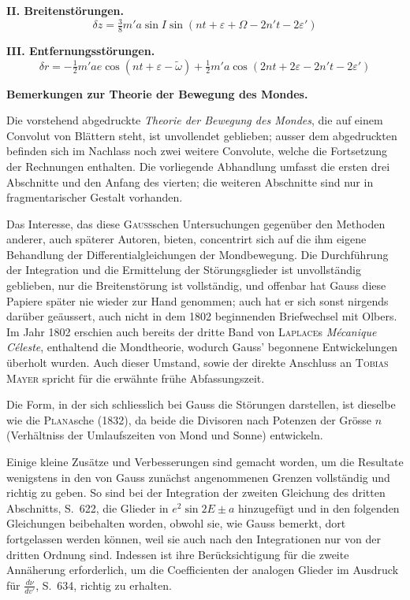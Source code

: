 \documentclass[10pt,a4paper]{article}
\begin{document}
\textbf{II. Breitenst\"orungen.}
\begin{equation*}
\delta z = \tfrac{3}{8}m'a\sin I\sin(nt + \varepsilon + \Omega - 2n't - 2\varepsilon')
\end{equation*}

\textbf{III. Entfernungsst\"orungen.}
\begin{equation*}
\delta r = -\tfrac{1}{2}m'ae\cos(nt + \varepsilon - \tilde{\omega}) + \tfrac{1}{2}m'a\cos(2nt + 2\varepsilon - 2n't - 2\varepsilon')
\end{equation*}

\newpage
\noindent\textbf{Bemerkungen zur Theorie der Bewegung des Mondes.}

\bigskip
\noindent
Die vorstehend abgedruckte \textit{Theorie der Bewegung des Mondes}, die auf einem Convolut von Bl\"attern steht, ist unvollendet geblieben; ausser dem abgedruckten befinden sich im Nachlass noch zwei weitere Convolute, welche die Fortsetzung der Rechnungen enthalten. Die vorliegende Abhandlung umfasst die ersten drei Abschnitte und den Anfang des vierten; die weiteren Abschnitte sind nur in fragmentarischer Gestalt vorhanden.

Das Interesse, das diese \textsc{Gauss}schen Untersuchungen gegen\"uber den Methoden anderer, auch sp\"aterer Autoren, bieten, concentrirt sich auf die ihm eigene Behandlung der Differentialgleichungen der Mondbewegung. Die Durchf\"uhrung der Integration und die Ermittelung der St\"orungsglieder ist unvollst\"andig geblieben, nur die Breitenst\"orung ist vollst\"andig, und offenbar hat Gauss diese Papiere sp\"ater nie wieder zur Hand genommen; auch hat er sich sonst nirgends dar\"uber ge\"aussert, auch nicht in dem 1802 beginnenden Briefwechsel mit Olbers. Im Jahr 1802 erschien auch bereits der dritte Band von\textsc{ Laplace}s \textit{M\'ecanique C\'eleste}, enthaltend die Mondtheorie, wodurch Gauss' begonnene Entwickelungen \"uberholt wurden. Auch dieser Umstand, sowie der direkte Anschluss an\textsc{ Tobias Mayer} spricht f\"ur die erw\"ahnte fr\"uhe Abfassungszeit.

Die Form, in der sich schliesslich bei Gauss die St\"orungen darstellen, ist dieselbe wie die\textsc{ Plana}sche (1832), da beide die Divisoren nach Potenzen der Gr\"osse $n$ (Verh\"altniss der Umlaufszeiten von Mond und Sonne) entwickeln.

\newpage
\noindent
Einige kleine Zus\"atze und Verbesserungen sind gemacht worden, um die Resultate wenigstens in den von Gauss zun\"achst angenommenen Grenzen vollst\"andig und richtig zu geben. So sind bei der Integration der zweiten Gleichung des dritten Abschnitts, S.~622, die Glieder in $e^2\sin 2E \pm a$ hinzugef\"ugt und in den folgenden Gleichungen beibehalten worden, obwohl sie, wie Gauss bemerkt, dort fortgelassen werden k\"onnen, weil sie auch nach den Integrationen nur von der dritten Ordnung sind. Indessen ist ihre Ber\"ucksichtigung f\"ur die zweite Ann\"aherung erforderlich, um die Coefficienten der analogen Glieder im Ausdruck f\"ur $\frac{d\nu}{dv'}$, S.~634, richtig zu erhalten.
\end{document}
